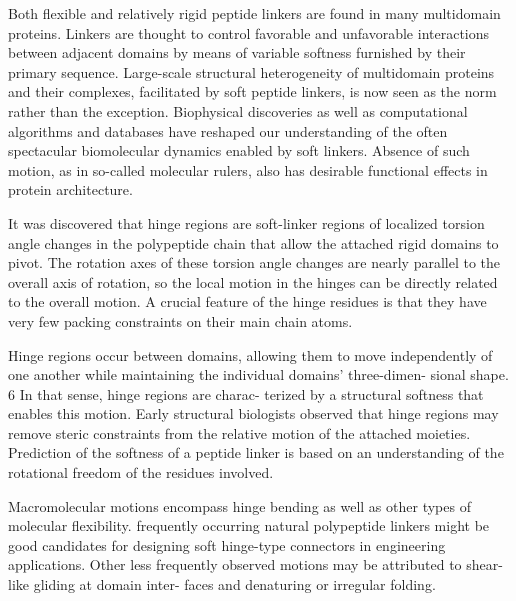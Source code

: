 Both flexible and relatively rigid peptide linkers are found in many multidomain proteins. 
Linkers are thought to control favorable and unfavorable interactions between adjacent domains by means of variable softness
furnished by their primary sequence. Large-scale structural heterogeneity of multidomain proteins
and their complexes, facilitated by soft peptide linkers, is now seen as the norm rather than the
exception. Biophysical discoveries as well as computational algorithms and databases have
reshaped our understanding of the often spectacular biomolecular dynamics enabled by soft linkers.
Absence of such motion, as in so-called molecular rulers, also has desirable functional effects in
protein architecture.


It was discovered that hinge regions are
soft-linker regions of localized torsion angle changes in
the polypeptide chain that allow the attached rigid
domains to pivot. The rotation axes of these torsion
angle changes are nearly parallel to the overall axis of
rotation, so the local motion in the hinges can be
directly related to the overall motion. A crucial feature
of the hinge residues is that they have very few packing
constraints on their main chain atoms.

Hinge regions occur between domains, allowing
them to move independently of one another while
maintaining the individual domains’ three-dimen-
sional shape. 6 In that sense, hinge regions are charac-
terized by a structural softness that enables this
motion.
Early structural biologists observed that
hinge regions may remove steric constraints from the
relative motion of the attached moieties.
Prediction of the softness of a peptide linker is
based on an understanding of the rotational freedom
of the residues involved.

Macromolecular motions encompass hinge bending
as well as other types of molecular flexibility.
frequently occurring natural
polypeptide linkers might be good candidates for
designing soft hinge-type connectors in engineering
applications. Other less frequently observed motions
may be attributed to shear-like gliding at domain inter-
faces and denaturing or irregular folding.



